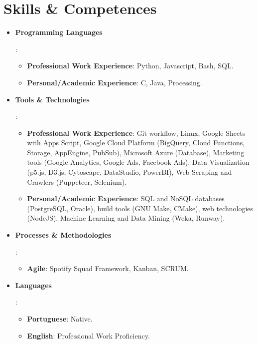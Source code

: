 \documentclass[letterpaper,11pt]{article}
\newcommand{\resumeItem}[2]{
  \item\small{
    \textbf{#1}{: #2 \vspace{-2pt}}
  }
}
\newcommand{\resumeItemListStart}{\begin{itemize}[leftmargin=*]}
\newcommand{\resumeItemListEnd}{\end{itemize}\vspace{-5pt}}
\begin{document}
\section{Skills \& Competences}
 \resumeItemListStart
    \resumeItem{Programming Languages}{
        \resumeItemListStart
            \resumeItem{Professional Work Experience}{Python, Javascript, Bash, SQL.}
            \resumeItem{Personal/Academic Experience}{C, Java, Processing.}
        \resumeItemListEnd
    }
    \resumeItem{Tools \& Technologies}{
        \resumeItemListStart
            \resumeItem{Professional Work Experience}{Git workflow, Linux, Google Sheets with Apps Script, Google Cloud Platform (BigQuery, Cloud Functions, Storage, AppEngine, PubSub), Microsoft Azure (Database), Marketing tools (Google Analytics, Google Ads, Facebook Ads), Data Visualization (p5.js, D3.js, Cytoscape, DataStudio, PowerBI), Web Scraping and Crawlers (Puppeteer, Selenium).}
            \resumeItem{Personal/Academic Experience}{SQL and NoSQL databases (PostgreSQL, Oracle), build tools (GNU Make, CMake), web technologies (NodeJS), Machine Learning and Data Mining (Weka, Runway).}
        \resumeItemListEnd
    }
    \resumeItem{Processes \& Methodologies}{
        \resumeItemListStart
            \resumeItem{Agile}{Spotify Squad Framework, Kanban, SCRUM.}
        \resumeItemListEnd
    }
    \resumeItem{Languages}{
        \resumeItemListStart
            \resumeItem{Portuguese}{Native.}
            \resumeItem{English}{Professional Work Proficiency.}
        \resumeItemListEnd
    }
 \resumeItemListEnd

\end{document}
